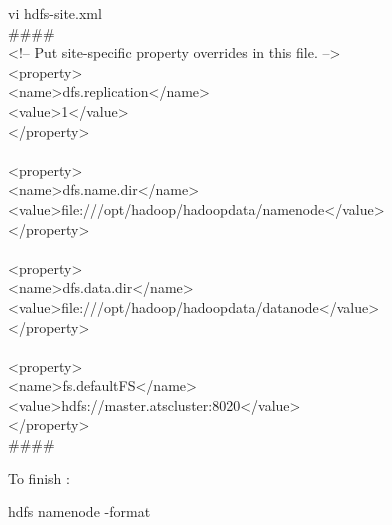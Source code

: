 \documentclass[a4paper]{article}
\begin{document}
\begin{center}
\begin{tcolorbox}[width=0.8\linewidth,colframe=black!5!white]
vi hdfs-site.xml
\\\#\#\#\#
\\    <!-- Put site-specific property overrides in this file. -->
\\ <property>
\\  <name>dfs.replication</name>
\\  <value>1</value>
\\ </property>
\\
\\<property>
\\  <name>dfs.name.dir</name>
\\  <value>file:///opt/hadoop/hadoopdata/namenode</value>
\\ </property>
\\
\\ <property>
\\  <name>dfs.data.dir</name>
\\  <value>file:///opt/hadoop/hadoopdata/datanode</value>
\\ </property>
\\
\\ <property>
\\  <name>fs.defaultFS</name>
\\  <value>hdfs://master.atscluster:8020</value>
\\ </property>
\\\#\#\#\#
\end{tcolorbox}
\end{center}

To finish :
\begin{center}
\begin{tcolorbox}[width=0.8\linewidth,colframe=black!5!white]
hdfs namenode -format
\end{tcolorbox}
\end{center}
%
%
%
%
%
%
\end{document}
